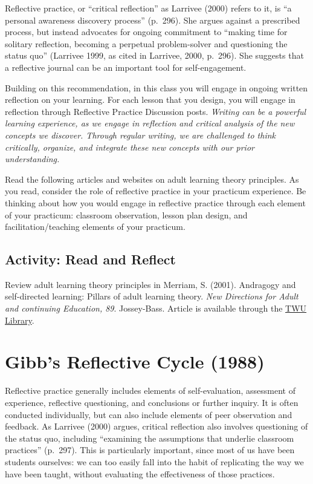 \documentclass[
]{book}
\begin{document}
Reflective practice, or ``critical reflection'' as Larrivee (2000) refers to it, is ``a personal awareness discovery process'' (p.~296). She argues against a prescribed process, but instead advocates for ongoing commitment to ``making time for solitary reflection, becoming a perpetual problem-solver and questioning the status quo'' (Larrivee 1999, as cited in Larrivee, 2000, p.~296). She suggests that a reflective journal can be an important tool for self-engagement.

Building on this recommendation, in this class you will engage in ongoing written reflection on your learning. For each lesson that you design, you will engage in reflection through Reflective Practice Discussion posts. \emph{Writing can be a powerful learning experience, as we engage in reflection and critical analysis of the new concepts we discover. Through regular writing, we are challenged to think critically, organize, and integrate these new concepts with our prior understanding.}

Read the following articles and websites on adult learning theory principles. As you read, consider the role of reflective practice in your practicum experience. Be thinking about how you would engage in reflective practice through each element of your practicum: classroom observation, lesson plan design, and facilitation/teaching elements of your practicum.

\hypertarget{activity-read-and-reflect}{%
\subsection*{Activity: Read and Reflect}\label{activity-read-and-reflect}}

\begin{reflect}
Review adult learning theory principles in Merriam, S. (2001). Andragogy and self-directed learning: Pillars of adult learning theory. \emph{New Directions for Adult and continuing Education, 89}. Jossey-Bass. Article is available through the \href{https://www.twu.ca/library/}{TWU Library}.
\end{reflect}

\hypertarget{gibbs-reflective-cycle-1988}{%
\section{Gibb's Reflective Cycle (1988)}\label{gibbs-reflective-cycle-1988}}

Reflective practice generally includes elements of self-evaluation, assessment of experience, reflective questioning, and conclusions or further inquiry. It is often conducted individually, but can also include elements of peer observation and feedback. As Larrivee (2000) argues, critical reflection also involves questioning of the status quo, including ``examining the assumptions that underlie classroom practices'' (p.~297). This is particularly important, since most of us have been students ourselves: we can too easily fall into the habit of replicating the way we have been taught, without evaluating the effectiveness of those practices.
\end{document}
